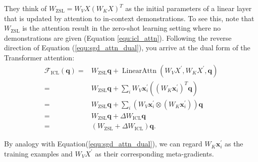 They think of $W_{\text{ZSL}} = W_{V} X \left( W_{K} X \right)^T$ as the initial parameters of a linear layer that is updated by attention to in-context demonstrations.
To see this, note that $W_{\text{ZSL}}$ is the attention result in the zero-shot learning setting where no demonstrations are given (Equation \ref{equ:icl_attn}). 
Following the reverse direction of Equation (\ref{equ:sgd_attn_dual}), you arrive at the dual form of the Transformer attention: 
\begin{equation}
    \begin{aligned}
        \mathcal{F}_{\text{ICL}}(\mathbf{q})
        = & W_{\text{ZSL}} \mathbf{q} + \operatorname{LinearAttn} \left( W_{V} X^{\prime}, W_{K} X^{\prime}, \mathbf{q} \right) \\
        = & W_{\text{ZSL}} \mathbf{q} + \sum_i W_{V} \textbf{x}^{\prime}_i \left( \left( W_{K} \textbf{x}^{\prime}_i \right)^T \mathbf{q} \right) \\
        = & W_{\text{ZSL}} \mathbf{q} + \sum_i \left( W_{V} \textbf{x}^{\prime}_i \otimes \left( W_{K} \textbf{x}^{\prime}_i \right) \right) \mathbf{q} \\
        = & W_{\text{ZSL}} \mathbf{q} + \Delta W_{\text{ICL}} \mathbf{q} \\
        = & \left( W_{\text{ZSL}} + \Delta W_{\text{ICL}} \right) \mathbf{q}. 
    \end{aligned}
    \label{equ:icl_opti_dual}
\end{equation}

By analogy with Equation(\ref{equ:sgd_attn_dual}), we can regard $W_{K} \textbf{x}^{\prime}_i$ as the training examples and $W_{V} X^{\prime}$ as their corresponding meta-gradients. 